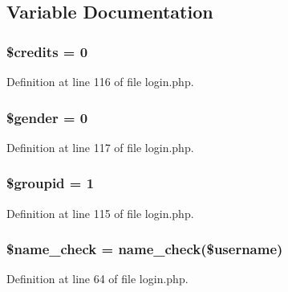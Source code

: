 \subsection{Variable Documentation}
\hypertarget{login_8php_a2019a1bb67946f4716cc99e5450c1ab0}{
\subsubsection[{\$credits}]{\setlength{\rightskip}{0pt plus 5cm}\$credits = 0}}\label{login_8php_a2019a1bb67946f4716cc99e5450c1ab0}


Definition at line 116 of file login.\+php.

\hypertarget{login_8php_a0f1d7cfb9dc6f494b9014885205fc47e}{
\subsubsection[{\$gender}]{\setlength{\rightskip}{0pt plus 5cm}\$gender = 0}}\label{login_8php_a0f1d7cfb9dc6f494b9014885205fc47e}


Definition at line 117 of file login.\+php.

\hypertarget{login_8php_acb3c80fc595983cc4ebdb2d266044fcd}{
\subsubsection[{\$groupid}]{\setlength{\rightskip}{0pt plus 5cm}\$groupid = 1}}\label{login_8php_acb3c80fc595983cc4ebdb2d266044fcd}


Definition at line 115 of file login.\+php.

\hypertarget{login_8php_af716337f8eca2d77ca207b0c2a6adfc6}{
\subsubsection[{\$name\+\_\+check}]{\setlength{\rightskip}{0pt plus 5cm}\${\bf name\+\_\+check} = {\bf name\+\_\+check}(\$username)}}\label{login_8php_af716337f8eca2d77ca207b0c2a6adfc6}


Definition at line 64 of file login.\+php.

